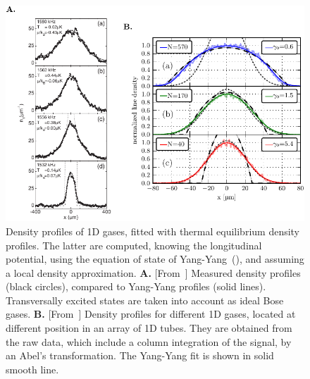 \documentclass[onecolumn,amsfonts,showpacs,superscriptaddress]{revtex4-1}
\begin{document}
\begin{figure}
    \centering
    \includegraphics{figures/figDEnsityProfiles_cropped.pdf}
    \caption{Density profiles of 1D gases, fitted with thermal equilibrium density profiles. The latter are computed, knowing the longitudinal potential, using the 
    equation of state of Yang-Yang~(\cite{yang1969thermodynamics}), and assuming a local density approximation.
    {\bf  A.} [From~\cite{van_amerongen_yang-yang_2008}] Measured density profiles (black circles), compared to Yang-Yang profiles (solid lines). Transversally excited states are taken into account as ideal Bose gases. {\bf B.} [From~\cite{vogler_thermodynamics_2013}]
    Density profiles for different 1D gases, located at different position in an array of 1D tubes.
    They are obtained from the raw data, which include a column integration of the signal, by an Abel's transformation. The Yang-Yang fit is shown in solid smooth line.}
    \label{fig:YangYangThermo}
\end{figure}
 
\end{document}
